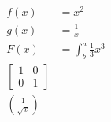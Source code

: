 \documentclass{article}
\begin{document}
\begin{align*}
f(x) &= x^2\\
g(x) &= \frac{1}{x}\\
F(x) &= \int^a_b \frac{1}{3}x^3\\
\left[
\begin{matrix}
1 & 0\\
0 & 1
\end{matrix}
\right]\\
\left(\frac{1}{\sqrt{x}}\right)
\end{align*}
\end{document}
